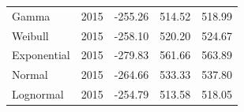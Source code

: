 \documentclass[
11pt, %
oneside, %
english, %
singlespacing, %
]{macthesis} %
\begin{document}
\begin{table}
\begin{tabular}[t]{llrrr}
\hspace{1em}Gamma & 2015 & -255.26 & 514.52 & 518.99\\
\hspace{1em}Weibull & 2015 & -258.10 & 520.20 & 524.67\\
\hspace{1em}Exponential & 2015 & -279.83 & 561.66 & 563.89\\
\hspace{1em}Normal & 2015 & -264.66 & 533.33 & 537.80\\
\hspace{1em}Lognormal & 2015 & -254.79 & 513.58 & 518.05\\
\bottomrule
\end{tabular}
\end{table}

\begin{table}
\centering\begingroup\fontsize{11}{13}\selectfont


\end{table}
\end{document}
